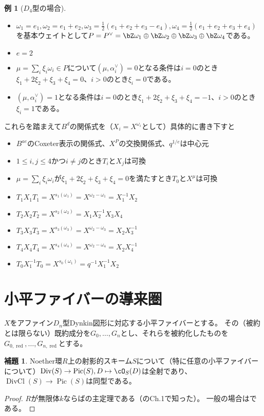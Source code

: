 \documentclass[uplatex, a4paper, dvipdfmx]{jsarticle}
\theoremstyle{definition}
\newtheorem{lemma}[theorem]{補題}
\newtheorem{example}[theorem]{例}
\DeclareMathOperator{\Pic}{\mathrm{Pic}}
\DeclareMathOperator{\red}{\mathrm{red}}
\DeclareMathOperator{\Div}{\mathrm{Div}}
\DeclareMathOperator{\DivCl}{\mathrm{DivCl}}
\begin{document}
\begin{example}[$D_4$型の場合]
    \begin{itemize}
        \item $\omega_1 = e_1, \omega_2 = e_1 + e_2, \omega_3 = \frac{1}{2}(e_1 + e_2 + e_3 - e_4), \omega_4 = \frac{1}{2}(e_1 + e_2 + e_3 + e_4)$を基本ウェイトとして$P = P^\vee = \bZ \omega_1 \oplus \bZ \omega_2 \oplus \bZ \omega_3 \oplus \bZ \omega_4$である。
        \item $e = 2$
        \item $\mu = \sum_i \xi_i \omega_i \in P$について$(\mu, \alpha_i^\vee) = 0$となる条件は$i=0$のとき$\xi_1 + 2\xi_2 + \xi_3 + \xi_4 = 0$、$i > 0$のとき$\xi_i = 0$である。
        \item $(\mu, \alpha_i^\vee) = 1$となる条件は$i=0$のとき$\xi_1 + 2\xi_2 + \xi_3 + \xi_4 = -1$、$i > 0$のとき$\xi_i = 1$である。
    \end{itemize}
    これらを踏まえて$B^d$の関係式を（$X_i = X^{\omega_i}$として）具体的に書き下すと
    \begin{itemize}
        \item $B^{ae}$のCoxeter表示の関係式、$X^P$の交換関係式、$q^{1/e}$は中心元
        \item $1\leq i, j \leq 4$かつ$i \neq j$のとき$T_i$と$X_j$は可換
        \item $\mu = \sum_i \xi_i \omega_i$が$\xi_1 + 2\xi_2 + \xi_3 + \xi_4 = 0$を満たすとき$T_0$と$X^\mu$は可換
        \item $T_1X_1T_1 = X^{s_1(\omega_1)} = X^{\omega_2-\omega_1} = X_1^{-1}X_2$
        \item $T_2X_2T_2 = X^{s_2(\omega_2)} = X_1X_2^{-1}X_3X_4$
        \item $T_3X_3T_3 = X^{s_3(\omega_3)} = X^{\omega_2-\omega_3} = X_2X_3^{-1}$
        \item $T_4X_4T_4 = X^{s_4(\omega_4)} = X^{\omega_2-\omega_4} = X_2X_4^{-1}$
        \item $T_0X_1^{-1}T_0 = X^{s_0(\omega_1)} = q^{-1}X_1^{-1}X_2$
    \end{itemize}
\end{example}
\section{小平ファイバーの導来圏}
$X$をアファイン$D_n$型Dynkin図形に対応する小平ファイバーとする。
その（被約とは限らない）既約成分を$G_0, \dots, G_n$とし、それらを被約化したものを$G_{0, \red}, \dots, G_{n, \red}$とする。
\begin{lemma}\label{lem:cartier-divisor-on-projective-scheme}
    Noether環$R$上の射影的スキーム$S$について（特に任意の小平ファイバーについて）$\Div(S) \to \Pic(S), D \mapsto \cO_S(D)$は全射であり、$\DivCl(S) \to \Pic(S)$は同型である。
\end{lemma}
\begin{proof}
    $R$が無限体$k$ならば\cite{MR0155830}の主定理である（\cite{MR2095471}のCh.1で知った）。
    一般の場合は\cite[Cor.11.28]{MR2675155}である。
\end{proof}
\end{document}
